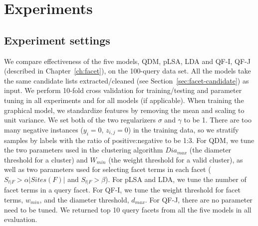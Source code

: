 \section{Experiments}
\label{sec:ie-exp}
\subsection{Experiment settings}
We compare effectiveness of the five models, QDM, pLSA, LDA and QF-I, QF-J (described in Chapter~\ref{ch:facet}), on the 100-query data set.
All the models take the same candidate lists extracted/cleaned (see Section~\ref{sec:facet-candidate}) as input.
We perform 10-fold cross validation for training/testing and parameter tuning in all experiments and for all models (if applicable).
When training the graphical model, we standardize features by removing the mean and scaling to unit variance.
We set both of the two regularizers $\sigma$ and $\gamma$ to be 1.
There are too many negative instances ($y_i=0$, $z_{i,j}=0$) in the training data, so we stratify samples by labels with the ratio of positive:negative to be 1:3.
For QDM, we tune the two parameters used in the clustering algorithm $Dia_{max}$ (the diameter threshold for a cluster) and $W_{min}$ (the weight threshold for a valid cluster), as well as two parameters used for selecting facet terms in each facet ($S_{t|F} > \alpha |Sites(F)|$ and $S_{t|F}>\beta$).
For pLSA and LDA, we tune the number of facet terms in a query facet.
For QF-I, we tune the weight threshold for facet terms, $w_{min}$, and the diameter threshold,  $d_{max}$.
For QF-J, there are no parameter need to be tuned.
We returned top 10 query facets from all the five models in all evaluation. 
